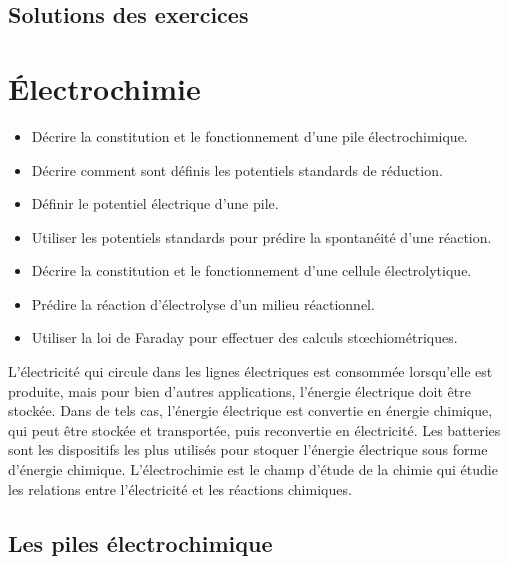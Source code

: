 \documentclass[
  11pt,
  a4paper,
  openany]{book}
\providecommand{\tightlist}{%
  \setlength{\itemsep}{0pt}\setlength{\parskip}{0pt}}
\begin{document}
\newpage

\section{Solutions des exercices} \shipoutAnswer

\hypertarget{uxe9lectrochimie}{%
\chapter{Électrochimie}\label{uxe9lectrochimie}}

\begin{objectives}

\begin{itemize}
\tightlist
\item
  Décrire la constitution et le fonctionnement d'une pile électrochimique.
\item
  Décrire comment sont définis les potentiels standards de réduction.
\item
  Définir le potentiel électrique d'une pile.
\item
  Utiliser les potentiels standards pour prédire la spontanéité d'une réaction.
\item
  Décrire la constitution et le fonctionnement d'une cellule électrolytique.
\item
  Prédire la réaction d'électrolyse d'un milieu réactionnel.
\item
  Utiliser la loi de Faraday pour effectuer des calculs stœchiométriques.
\end{itemize}

\end{objectives}

L'électricité qui circule dans les lignes électriques est consommée lorsqu'elle est produite, mais pour bien d'autres applications, l'énergie électrique doit être stockée. Dans de tels cas, l'énergie électrique est convertie en énergie chimique, qui peut être stockée et transportée, puis reconvertie en électricité. Les batteries sont les dispositifs les plus utilisés pour stoquer l'énergie électrique sous forme d'énergie chimique. L'électrochimie est le champ d'étude de la chimie qui étudie les relations entre l'électricité et les réactions chimiques.

\hypertarget{les-piles-uxe9lectrochimique}{%
\section{Les piles électrochimique}\label{les-piles-uxe9lectrochimique}}
\end{document}
